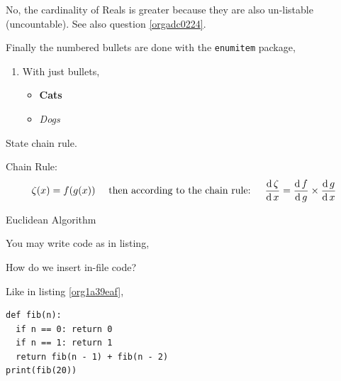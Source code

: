 \documentclass{homework}
\begin{document}
No, the cardinality of Reals is greater because they are also un-listable (uncountable). See also question \ref{orgadc0224}.

\question Finally the numbered bullets are done with the \texttt{enumitem} package,
\label{sec:orgb8dad70}

\begin{enumerate}
\item With just bullets,
\begin{itemize}
\item \textbf{Cats}
\item \emph{Dogs}
\end{itemize}
\end{enumerate}

\question [1 (Bonus)] State chain rule.
\label{sec:orgd736884}

Chain Rule:
\[
\zeta(x) = f(g(x)) \quad \text{ then according to the chain rule: } \quad
\derivative{\zeta} = \derivative[g]{f} \times \derivative{g}
\]

\question [2 (Bonus)] Euclidean Algorithm
\label{sec:orgf81143a}

You may write code as in listing,



\question How do we insert in-file code?
\label{sec:org318e130}

Like in listing \ref{org1a39eaf},

\begin{lstlisting}
def fib(n):
  if n == 0: return 0
  if n == 1: return 1
  return fib(n - 1) + fib(n - 2)
print(fib(20))
\end{lstlisting}




\end{document}
